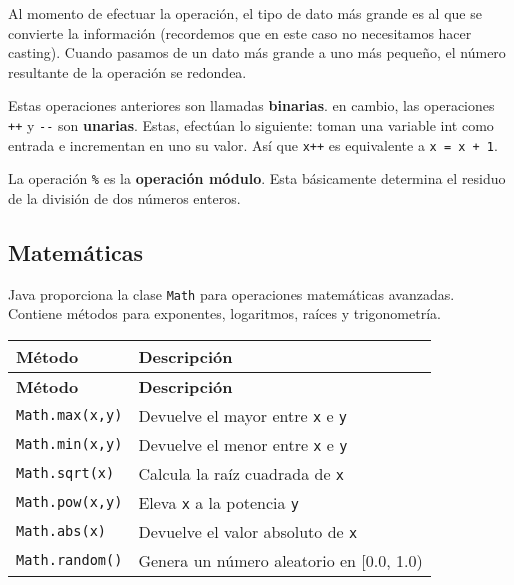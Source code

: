 \documentclass[12pt]{article}
\newcounter{it}
\theoremstyle{largebreak}
\begin{document}
    \begin{obs}
        Al momento de efectuar la operación, el tipo de dato más grande es al que se convierte la información (recordemos que en este caso no necesitamos hacer casting). Cuando pasamos de un dato más grande a uno más pequeño, el número resultante de la operación se redondea.
    \end{obs}

    Estas operaciones anteriores son llamadas \textbf{binarias}. en cambio, las operaciones \lstinline|++| y \lstinline|--| son \textbf{unarias}. Estas, efectúan lo siguiente: toman una variable int como entrada e incrementan en uno su valor. Así que \lstinline|x++| es equivalente a \lstinline|x = x + 1|.

    La operación \lstinline|%| es la \textbf{operación módulo}. Esta básicamente determina el residuo de la división de dos números enteros.

    \subsection{Matemáticas}

    Java proporciona la clase \lstinline|Math| para operaciones matemáticas avanzadas. Contiene métodos para exponentes, logaritmos, raíces y trigonometría.

    \begin{longtable}{l p{}}
        \toprule
        \textbf{Método} & \textbf{Descripción} \\
        \midrule
        \endfirsthead

        \midrule
        \textbf{Método} & \textbf{Descripción} \\
        \midrule
        \endhead

        \bottomrule
        \endfoot

        \lstinline|Math.max(x,y)| & Devuelve el mayor entre \lstinline|x| e \lstinline|y| \\
        \lstinline|Math.min(x,y)| & Devuelve el menor entre \lstinline|x| e \lstinline|y| \\
        \lstinline|Math.sqrt(x)| & Calcula la raíz cuadrada de \lstinline|x| \\
        \lstinline|Math.pow(x,y)| & Eleva \lstinline|x| a la potencia \lstinline|y| \\
        \lstinline|Math.abs(x)| & Devuelve el valor absoluto de \lstinline|x| \\
        \lstinline|Math.random()| & Genera un número aleatorio en [0.0, 1.0) \\
    \end{longtable}
\end{document}
